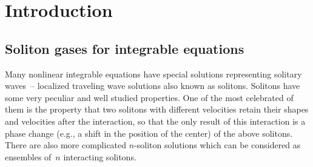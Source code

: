 \documentclass[pdftex]{sigma}
\numberwithin{equation}{section}
\begin{document}


\renewcommand{\thefootnote}{\arabic{footnote}}
\setcounter{footnote}{0}

\section{Introduction}


\subsection{Soliton gases for integrable equations}
Many nonlinear integrable equations have special solutions representing solitary waves~--
localized traveling wave solutions also known as solitons. Solitons have some very peculiar and well studied properties. One of the most celebrated of them is the property that two solitons with different velocities retain their shapes and velocities after the interaction, so that the only result of this interaction is a phase change (e.g., a shift in the position of the center) of the above solitons. There are also more complicated $n$-soliton solutions which can be considered as ensembles of~$n$ interacting solitons.
\end{document}
